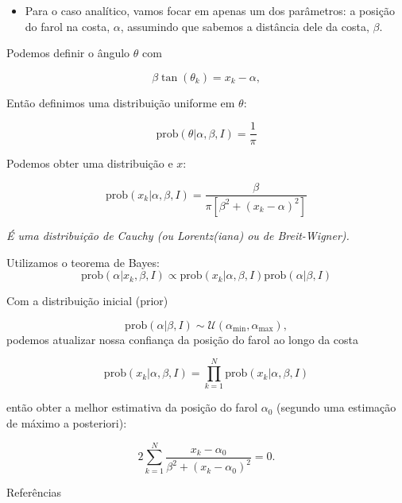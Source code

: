 \documentclass[aspectratio=169,xcolor=dvipsnames]{beamer}
\newcommand{\prob}{\text{prob}}
\begin{document}
\begin{frame}
  \begin{itemize}
    \item Para o caso analítico, vamos focar em apenas um dos parâmetros: a posição do farol na costa, $\alpha$, assumindo que sabemos a distância dele da costa, $\beta$.
  \end{itemize}

  Podemos definir o ângulo $\theta$ com

  \begin{equation}
    \beta \tan(\theta_k) = x_k - \alpha,
  \end{equation}

  Então definimos uma distribuição uniforme em $\theta$:

  \begin{equation}
    \prob(\theta | \alpha, \beta, I) = \frac{1}{\pi}
  \end{equation}

  Podemos obter uma distribuição e $x$:

  \begin{equation}
    \prob(x_k | \alpha, \beta, I) = \frac{\beta}{\pi \left[ \beta^2 + (x_k - \alpha)^2 \right]} 
  \end{equation}

  \emph{É uma distribuição de Cauchy (ou Lorentz(iana) ou de Breit-Wigner).}
\end{frame}

\begin{frame} 
  Utilizamos o teorema de Bayes:
  \begin{equation}
    \prob(\alpha | {x_k}, \beta, I) \propto \prob({x_k} | \alpha, \beta, I) \prob(\alpha | \beta, I)
  \end{equation}

  Com a distribuição inicial (prior)

  \begin{equation}
    \prob(\alpha | \beta, I) \sim \mathcal{U}(\alpha_\text{min}, \alpha_\text{max}),
  \end{equation}
  podemos atualizar nossa confiança da posição do farol ao longo da costa

  \begin{equation}
    \prob({x_k} | \alpha, \beta, I) = \prod_{k=1}^{N} \prob(x_k | \alpha, \beta, I)
  \end{equation}

  então obter a melhor estimativa da posição do farol $\alpha_0$ (segundo uma estimação de máximo a posteriori):

  \begin{equation}
    2 \sum_{k=1}^{N} \frac{x_k - \alpha_0}{\beta^2 + (x_k - \alpha_0)^2} = 0.
  \end{equation}
\end{frame}

\begin{frame}{Referências}
  \printbibliography[heading=none] 
\end{frame}
\end{document}
